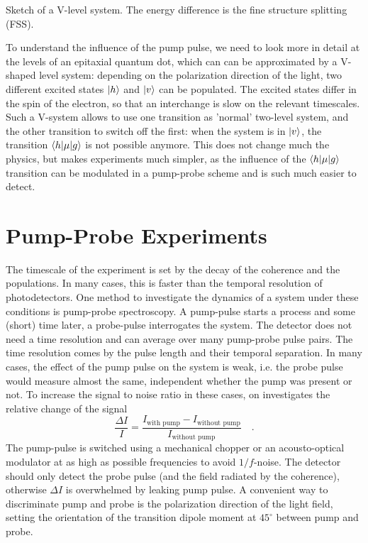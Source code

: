 \begin{marginfigure}
\caption{Sketch of a V-level system. The energy difference is the fine structure splitting (FSS).}
\end{marginfigure}


To understand the influence of the pump pulse, we need to look more in detail at the levels of an epitaxial  quantum dot, which can  can be approximated by a V-shaped level system: depending on the polarization direction of the light, two different excited states $\ket{h}$ and $\ket{v}$
 can be populated. The excited states differ in the spin of the electron, so that an interchange is slow on the relevant timescales. Such a V-system allows to use one transition as 'normal' two-level system, and the other transition to switch off the first: when the system is in $\ket{v}$, the transition $\braket{h | \mu | g}$ is not possible anymore. This does not change much the physics, but makes experiments much simpler, as the influence of the  $\braket{h | \mu | g}$ transition can be modulated in a pump-probe scheme and is such much easier to detect.
 


\section{Pump-Probe Experiments}

The timescale of the experiment is set by the decay of the coherence and the populations. In many cases, this is faster than the temporal resolution of photodetectors. One method to investigate the dynamics of a system under these conditions is pump-probe spectroscopy. A pump-pulse starts a process and some (short) time later, a probe-pulse interrogates the system. The detector does not need a time resolution and can average over many pump-probe pulse pairs. The time resolution comes by the pulse length and their temporal separation. In many cases, the effect of the pump pulse on the system is weak, i.e. the probe pulse would measure almost the same, independent whether the pump was present or not. To increase the signal to noise ratio in these cases, on investigates the relative change of the signal
\begin{equation}
 \frac{\Delta I}{I} = \frac{I_\text{with pump} - I_\text{without pump} }{I_\text{without pump}} \quad .
\end{equation}
The pump-pulse is switched using a mechanical chopper or an acousto-optical modulator at as high as possible frequencies to avoid $1/f$-noise. The detector should only detect the probe pulse (and the field radiated by the coherence), otherwise $\Delta I$ is overwhelmed by leaking pump pulse. A convenient way to discriminate pump and probe is the polarization direction of the light field, setting the orientation of the transition dipole moment at $45^\circ$ between pump and probe.

